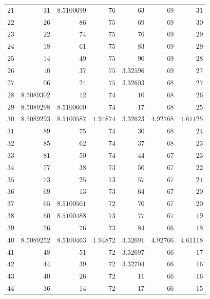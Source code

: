 \begin{center}
\begin{tabular}{||r||r|r|r|r|r|r||}
\(21\) & \(31\) & \(8.5100699\) & \(76\) & \(63\) & \(69\) & \(31\)\\
\(22\) & \(26\) & \(86\) & \(75\) & \(69\) & \(69\) & \(30\)\\
\(23\) & \(22\) & \(74\) & \(75\) & \(76\) & \(69\) & \(29\)\\
\(24\) & \(18\) & \(61\) & \(75\) & \(83\) & \(69\) & \(29\)\\
\(25\) & \(14\) & \(49\) & \(75\) & \(90\) & \(69\) & \(28\)\\
\(26\) & \(10\) & \(37\) & \(75\) & \(3.32596\) & \(69\) & \(27\)\\
\(27\) & \(06\) & \(24\) & \(75\) & \(3.32603\) & \(68\) & \(27\)\\
\(28\) & \(8.5089302\) & \(12\) & \(74\) & \(10\) & \(68\) & \(26\)\\
\(29\) & \(8.5089298\) & \(8.5100600\) & \(74\) & \(17\) & \(68\) & \(25\)\\[3pt]
\(30\) & \(8.5089293\) & \(8.5100587\) & \(1.94874\) & \(3.32623\) & \(4.92768\) & \(4.61125\)\\
\(31\) & \(89\) & \(75\) & \(74\) & \(30\) & \(68\) & \(24\)\\
\(32\) & \(85\) & \(62\) & \(74\) & \(37\) & \(68\) & \(23\)\\
\(33\) & \(81\) & \(50\) & \(74\) & \(44\) & \(67\) & \(23\)\\
\(34\) & \(77\) & \(38\) & \(73\) & \(50\) & \(67\) & \(22\)\\
\(35\) & \(73\) & \(25\) & \(73\) & \(57\) & \(67\) & \(21\)\\
\(36\) & \(69\) & \(13\) & \(73\) & \(64\) & \(67\) & \(20\)\\
\(37\) & \(65\) & \(8.5100501\) & \(72\) & \(70\) & \(67\) & \(20\)\\
\(38\) & \(60\) & \(8.5100488\) & \(73\) & \(77\) & \(67\) & \(19\)\\
\(39\) & \(56\) & \(76\) & \(73\) & \(84\) & \(66\) & \(18\)\\[3pt]
\(40\) & \(8.5089252\) & \(8.5100463\) & \(1.94872\) & \(3.32691\) & \(4.92766\) & \(4.61118\)\\
\(41\) & \(48\) & \(51\) & \(72\) & \(3.32697\) & \(66\) & \(17\)\\
\(42\) & \(44\) & \(39\) & \(72\) & \(3.32704\) & \(66\) & \(16\)\\
\(43\) & \(40\) & \(26\) & \(72\) & \(11\) & \(66\) & \(16\)\\
\(44\) & \(36\) & \(14\) & \(72\) & \(17\) & \(66\) & \(15\)\\

\end{tabular}
\end{center}
